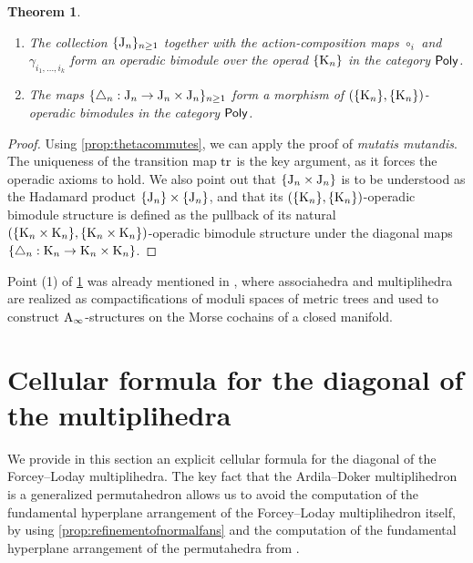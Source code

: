 \documentclass[twoside, 12pt]{amsart}
\newtheorem{theorem}{Theorem}
\theoremstyle{remark}
\begin{document}
\begin{theorem}\label{thm:MainOperad}\leavevmode
\begin{enumerate}[leftmargin=*]
\item The collection $\{\mathrm{J}_n\}_{n\geq 1}$ together with the action-composition maps $\circ_i$ and $\gamma_{i_1,\ldots,i_k}$ form an operadic bimodule over the operad $\{\mathrm{K}_n\}$ in the category $\mathsf{Poly}$. 

\item The maps $\{\triangle_n : \mathrm{J}_n \to \mathrm{J}_n\times \mathrm{J}_n\}_{n\geq 1}$ form a morphism of $(\{\mathrm{K}_n\},\{\mathrm{K}_n\})$-operadic bimodules in the category $\mathsf{Poly}$. 
\end{enumerate}
\end{theorem}

\begin{proof}
Using \cref{prop:thetacommutes}, we can apply the proof of \cite[Theorem~1]{MTTV19} \emph{mutatis mutandis}. The uniqueness of the transition map $\mathrm{tr}$ is the key argument, as it forces the operadic axioms to hold. We also point out that $\{ \mathrm{J}_n\times \mathrm{J}_n \}$ is to be understood as the Hadamard product $\{ \mathrm{J}_n \} \times \{ \mathrm{J}_n \}$, and that its $(\{\mathrm{K}_n\},\{\mathrm{K}_n\})$-operadic bimodule structure is defined as the pullback of its natural $(\{\mathrm{K}_n \times \mathrm{K}_n\},\{\mathrm{K}_n \times \mathrm{K}_n\})$-operadic bimodule structure under the diagonal maps $\{ \triangle_n : \mathrm{K}_n \to \mathrm{K}_n \times \mathrm{K}_n \}$.
\end{proof}

Point (1) of \cref{thm:MainOperad} was already mentioned in \cite{Mazuir21}, where associahedra and multiplihedra are realized as compactifications of moduli spaces of metric trees and used to construct $\mathrm{A}_\infty$-structures on the Morse cochains of a closed manifold.


\section{Cellular formula for the diagonal of the multiplihedra} \label{sec:III}

We provide in this section an explicit cellular formula for the diagonal of the Forcey--Loday multiplihedra. 
The key fact that the Ardila--Doker multiplihedron is a generalized permutahedron allows us to avoid the computation of the fundamental hyperplane arrangement of the Forcey--Loday multiplihedron itself, by using \cref{prop:refinementofnormalfans} and the computation of the fundamental hyperplane arrangement of the permutahedra from \cite{LA21}. 
\end{document}

